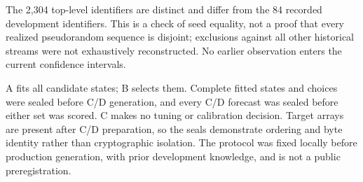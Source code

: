The 2,304 top-level identifiers are distinct and differ from the 84 recorded development identifiers. This is a check of seed equality, not a proof that every realized pseudorandom sequence is disjoint; exclusions against all other historical streams were not exhaustively reconstructed. No earlier observation enters the current confidence intervals.

A fits all candidate states; B selects them. Complete fitted states and choices were sealed before C/D generation, and every C/D forecast was sealed before either set was scored. C makes no tuning or calibration decision. Target arrays are present after C/D preparation, so the seals demonstrate ordering and byte identity rather than cryptographic isolation. The protocol was fixed locally before production generation, with prior development knowledge, and is not a public preregistration.
